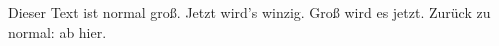 Dieser Text ist normal groß. Jetzt wird's \tiny winzig. Groß wird es \huge jetzt. Zurück zu normal: \normalsize ab hier. 